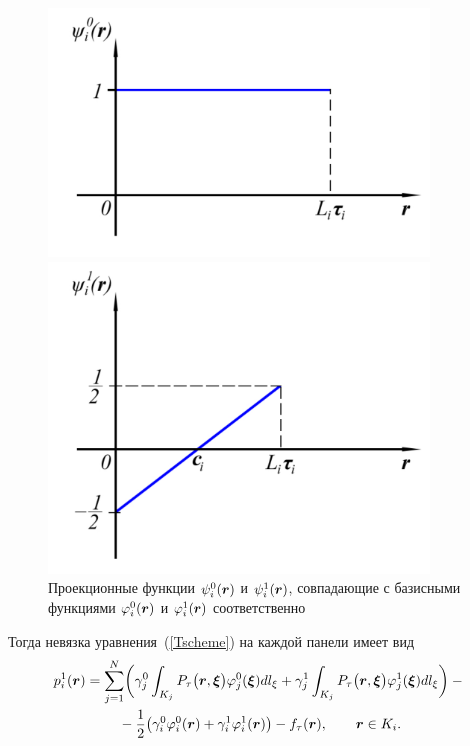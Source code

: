\documentclass[12pt, a4paper]{article}
\renewcommand{\vec}[1]{\text{\mathversion{bold}${#1}$}}%
\begin{document}
\begin{figure}[!h]
	\begin{minipage}[h]{0.5\textwidth}
		\center\includegraphics[width=0.9\textwidth]{phi0}
	\end{minipage}
	\begin{minipage}[h]{0.5\textwidth}
		\center\includegraphics[width=0.9\textwidth]{phi1}
	\end{minipage}
\caption{Проекционные функции $\psi_i^0(\vec r)$ и $\psi_i^1(\vec r)$, совпадающие с базисными функциями $\varphi_i^0(\vec r)$ и $\varphi_i^1(\vec r)$ соответственно}\label{phi01}
\end{figure}
Тогда невязка уравнения~(\ref{Tscheme}) на каждой панели имеет вид
\begin{multline*}
p_i^1 (\vec r) = \sum_{j=1}^N \biggl(
\gamma_j^0 \int_{K_j} P_\tau \bigl( \vec r, \vec \xi \bigr) \varphi_j^0(\vec \xi) dl_\xi +
\gamma_j^1 \int_{K_j} P_\tau \bigl( \vec r, \vec \xi \bigr) \varphi_j^1(\vec \xi) dl_\xi
\biggr) - {} \\
{} -\frac 1 2 \bigl(\gamma_i^0 \varphi_i^0(\vec r) + \gamma_i^1 \varphi_i^1(\vec r) \bigr) - f_\tau(\vec r), \qquad \vec r \in K_i.
\end{multline*}
\end{document}
